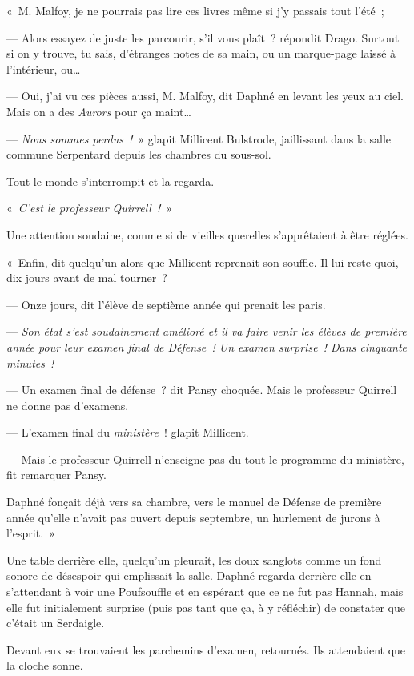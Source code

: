 «~M. Malfoy, je ne pourrais pas lire ces livres même si j'y passais tout l'été~;

--- Alors essayez de juste les parcourir, s'il vous plaît~? répondit Drago.
Surtout si on y trouve, tu sais, d'étranges notes de sa main, ou un marque-page laissé à l'intérieur, ou…

--- Oui, j'ai vu ces pièces aussi, M. Malfoy, dit Daphné en levant les yeux au ciel.
Mais on a des \emph{Aurors} pour ça maint…

--- \emph{Nous sommes perdus~!}~» glapit Millicent Bulstrode, jaillissant dans la salle commune Serpentard depuis les chambres du sous-sol.

Tout le monde s'interrompit et la regarda.

«~\emph{C'est le professeur Quirrell~!}~»

Une attention soudaine, comme si de vieilles querelles s'apprêtaient à être réglées.

«~Enfin, dit quelqu'un alors que Millicent reprenait son souffle.
Il lui reste quoi, dix jours avant de mal tourner~?

--- Onze jours, dit l'élève de septième année qui prenait les paris.

--- \emph{Son état s'est soudainement amélioré et il va faire venir les élèves de première année pour leur examen final de Défense~!
Un examen surprise~!
Dans cinquante minutes~!}

--- Un examen final de défense~? dit Pansy choquée.
Mais le professeur Quirrell ne donne pas d'examens.

--- L'examen final du \emph{ministère}~! glapit Millicent.

--- Mais le professeur Quirrell n'enseigne pas du tout le programme du ministère, fit remarquer Pansy.

Daphné fonçait déjà vers sa chambre, vers le manuel de Défense de première année qu'elle n'avait pas ouvert depuis septembre, un hurlement de jurons à l'esprit.~»

\later

Une table derrière elle, quelqu'un pleurait, les doux sanglots comme un fond sonore de désespoir qui emplissait la salle.
Daphné regarda derrière elle en s'attendant à voir une Poufsouffle et en espérant que ce ne fut pas Hannah, mais elle fut initialement surprise (puis pas tant que ça, à y réfléchir) de constater que c'était un Serdaigle.

Devant eux se trouvaient les parchemins d'examen, retournés.
Ils attendaient que la cloche sonne.

